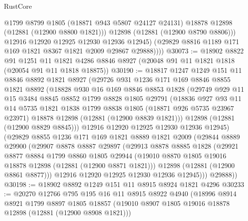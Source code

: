 \begin{lexlean}{RustCore}
\begin{coremodule}
                @1799
                @8799
                @1805
                (@18871 @943 @5807 @24127 @24131)
                @18878
                @12898
                (@12881 (@12900 @8800 @1821)))
              @12898
              (@12881 (@12900 @8790 @8806)))
            @12916
            @12920
            @12925
            @12930
            @12936
            @12945)
          (@29829 @8816 @1189 @171 @169 @1821 @8367 @1821 @2009 @29867 @29888))))
@30073 := @18902
    @8822
    @91
    @1251
    @11
    @1821
    @4286
    @8846
    @8927
    (@20048 @91 @11 @1821 @1818 (@20054 @91 @11 @1818 @18875))
@30190 := @18817
    @1247
    @1249
    @151
    @11
    @8846
    @8892
    @1821
    @8927
    (@29726
      @931
      @1236
      @171
      @169
      @8846
      @8855
      @1821
      @8892
      (@18828
        @930
        @16
        @169
        @8846
        @8853
        @1828
        (@29749
          @929
          @11
          @15
          @3484
          @8845
          @8852
          @1799
          @8828
          @1805
          @29791
          (@18836
            @927
            @93
            @11
            @14
            @5735
            @1821
            @1838
            @1799
            @8838
            @1805
            (@18871 @926 @5735 @23967 @23971)
            @18878
            @12898
            (@12881 (@12900 @8839 @1821)))
          @12898
          (@12881 (@12900 @8829 @8845)))
        @12916
        @12920
        @12925
        @12930
        @12936
        @12945)
      (@29829
        @8855
        @1236
        @171
        @169
        @1821
        @8889
        @1821
        @2009
        (@29844
          @8889
          @29900
          (@29907
            @8878
            @8887
            @29897
            (@29913
              @8878
              @8885
              @1828
              (@29921
                @8877
                @8884
                @1799
                @8860
                @1805
                @29944
                (@19010 @8870 @1805 @19016 @18878 @12898 (@12881 (@12900 @8871 @1821)))
                @12898
                (@12881 (@12900 @8861 @8877)))
              @12916
              @12920
              @12925
              @12930
              @12936
              @12945)))
        @29888))
@30198 := @18902 @8892 @1249 @151 @11 @8915 @8924 @1821 @4296
@30233 := @20270
    @12766
    @795
    @195
    @16
    @11
    @8915
    @8922
    @4940
    (@18996
      @8914
      @8921
      @1799
      @8897
      @1805
      @18857
      (@19010 @8907 @1805 @19016 @18878 @12898 (@12881 (@12900 @8908 @1821)))

\end{coremodule}
\end{lexlean}
